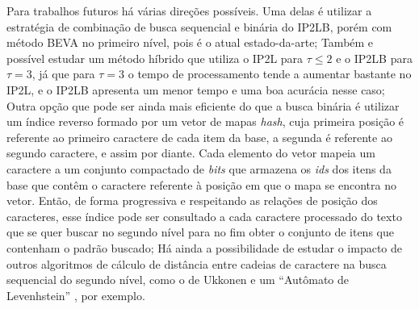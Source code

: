 Para trabalhos futuros há várias direções possíveis. Uma delas é utilizar a estratégia de combinação de busca sequencial e binária do IP2LB, porém com método BEVA no primeiro nível, pois é o atual estado-da-arte; Também e possível estudar um método híbrido que utiliza o IP2L para $\tau \leq 2$ e o IP2LB para $\tau = 3$, já que para $\tau=3$ o tempo de processamento tende a aumentar bastante no IP2L, e o IP2LB apresenta um menor tempo e uma boa acurácia nesse caso; Outra opção que pode ser ainda mais eficiente do que a busca binária é utilizar um índice reverso formado por um vetor de mapas \textit{hash}, cuja primeira posição é referente ao primeiro caractere de cada item da base, a segunda é referente ao segundo caractere, e assim por diante. Cada elemento do vetor mapeia um caractere a um conjunto compactado de \textit{bits} que armazena os \textit{ids} dos itens da base que contêm o caractere referente à posição em que o mapa se encontra no vetor. Então, de forma progressiva e respeitando as relações de posição dos caracteres, esse índice pode ser consultado a cada caractere processado do texto que se quer buscar no segundo nível para no fim obter o conjunto de itens que contenham o padrão buscado; Há ainda a possibilidade de estudar o impacto de outros algoritmos de cálculo de distância entre cadeias de caractere na busca sequencial do segundo nível, como o de Ukkonen \citep{ukkonen1985algorithms} e um ``Autômato de Levenhstein'' \citep{schulz2002fast}, por exemplo.